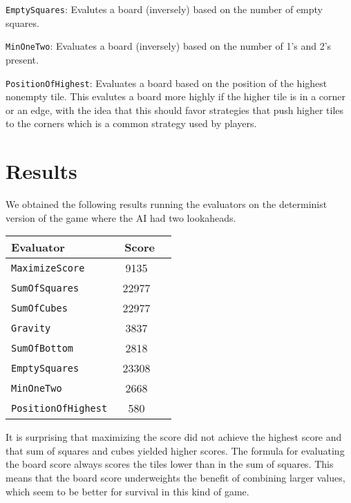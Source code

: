 \documentclass[11pt]{article}
\begin{document}
\texttt{EmptySquares}: Evalutes a board (inversely) based on the number of empty squares.

\texttt{MinOneTwo}: Evaluates a board (inversely) based on the number of 1's and 2's present. 

\texttt{PositionOfHighest}: Evaluates a board based on the position of the highest nonempty tile. This evalutes a board more highly if the higher tile is in a corner or an edge, with the idea that this should favor strategies that push higher tiles to the corners which is a common strategy used by players. 

\section{Results}

We obtained the following results running the evaluators on the determinist version of the game where the AI had two lookaheads.

\begin{tabular}{l c c}
\hline\hline %
Evaluator & \ Score
\\ [0.5ex] 
\hline %
 
\texttt{MaximizeScore} & 9135 \\

\texttt{SumOfSquares} &  22977 \\

\texttt{SumOfCubes} &  22977  \\

\texttt{Gravity} & 3837   \\

\texttt{SumOfBottom} & 2818  \\

\texttt{EmptySquares} & 23308  \\

\texttt{MinOneTwo} & 2668\\

\texttt{PositionOfHighest} & 580  \\
 
\hline %
\end{tabular}

It is surprising that maximizing the score did not achieve the highest score and that sum of squares and cubes yielded higher scores. The formula for evaluating the board score always scores the tiles lower than in the sum of squares. This means that the board score underweights the benefit of combining larger values, which seem to be better for survival in this kind of game. 
\end{document}
